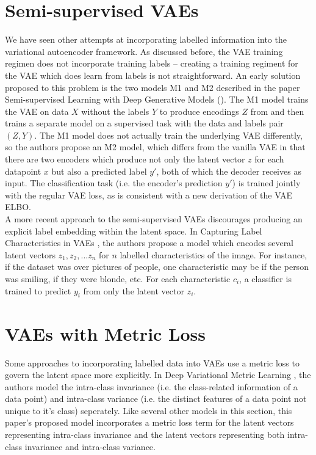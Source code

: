 \documentclass[./dissertation.tex]{subfiles}
\begin{document}
\section{Semi-supervised VAEs}
We have seen other attempts at incorporating labelled information into the variational autoencoder framework. As discussed before, the VAE training regimen does not incorporate training labels -- creating a training regiment for the VAE which does learn from labels is not straightforward. An early solution proposed to this problem is the two models M1 and M2 described in the paper Semi-supervised Learning with Deep Generative Models (\cite{kingma2014autoencoding}). The M1 model trains the VAE on data $X$ without the labels $Y$ to produce encodings $Z$ from and then trains a separate model on a supervised task with the data and labels pair $(Z, Y)$. The M1 model does not actually train the underlying VAE differently, so the authors propose an M2 model, which differs from the vanilla VAE in that there are two encoders which produce not only the latent vector $z$ for each datapoint $x$ but also a predicted label $y'$, both of which the decoder receives as input. The classification task (i.e. the encoder's prediction $y'$) is trained jointly with the regular VAE loss, as is consistent with a new derivation of the VAE ELBO. \\

A more recent approach to the semi-supervised VAEs discourages producing an explicit label embedding within the latent space. In Capturing Label Characteristics in VAEs \cite{joy2020capturing}, the authors propose a model which encodes several latent vectors $z_{1}, z_{2}, ... z_{n}$ for $n$ labelled characteristics of the image. For instance, if the dataset was over pictures of people, one characteristic may be if the person was smiling, if they were blonde, etc. For each characteristic $c_{i}$, a classifier is trained to predict $y_{i}$ from only the latent vector $z_{i}$.

\section{VAEs with Metric Loss}

Some approaches to incorporating labelled data into VAEs use a metric loss to govern the latent space more explicitly. In Deep Variational Metric Learning \cite{lin2018deep}, the authors model the intra-class invariance (i.e. the class-related information of a data point) and intra-class variance (i.e. the distinct features of a data point not unique to it's class) seperately. Like several other models in this section, this paper's proposed model incorporates a metric loss term for the latent vectors representing intra-class invariance and the latent vectors representing both intra-class invariance and intra-class variance. \\
\end{document}
